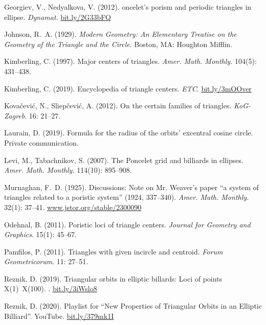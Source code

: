 \begin{thebibliography}{10}
Georgiev, V., Nedyalkova, V. (2012).
oncelet’s porism and periodic triangles in ellipse.
\newblock \emph{Dynamat}.
\newblock \url{bit.ly/2G33bFQ}

Johnson, R.~A. (1929).
\newblock \emph{Modern Geometry: An Elementary Treatise on the Geometry of the
  Triangle and the Circle}.
\newblock Boston, MA: Houghton Mifflin.

Kimberling, C. (1997).
\newblock Major centers of triangles.
\newblock \emph{Amer. Math. Monthly.} 104(5): 431--438.

Kimberling, C. (2019).
\newblock Encyclopedia of triangle centers.
\newblock \emph{ETC}.
\newblock \url{bit.ly/3mOOver}

Kova\v{c}evi\'c, N., Sliep\v{c}evi\'c, A. (2012).
\newblock On the certain families of triangles.
\newblock \emph{KoG-Zagreb}. 16: 21--27.

Laurain, D. (2019).
\newblock Formula for the radius of the orbits' excentral cosine circle.
\newblock Private communication.

Levi, M., Tabachnikov, S. (2007).
\newblock The {P}oncelet grid and billiards in ellipses.
\newblock \emph{Amer. Math. Monthly.} 114(10): 895--908.

Murnaghan, F.~D. (1925).
\newblock Discussions: Note on {Mr. Weaver}'s paper ``a system of triangles
  related to a poristic system'' (1924, 337--340).
\newblock \emph{Amer. Math. Monthly.} 32(1): 37--41.
\newblock \url{www.jstor.org/stable/2300090}

Odehnal, B. (2011).
\newblock Poristic loci of triangle centers.
\newblock \emph{Journal for Geometry and Graphics}. 15(1): 45--67.

Pamfilos, P. (2011).
\newblock Triangles with given incircle and centroid.
\newblock \emph{Forum Geometricorum}. 11: 27--51.

Reznik, D. (2019).
\newblock Triangular orbits in elliptic billards: Loci of points {X(1)~X(100)}.
.
\newblock \url{bit.ly/3iWslo8}

Reznik, D. (2020).
\newblock Playlist for {``New Properties of Triangular Orbits in an Elliptic
  Billiard''}.
\newblock YouTube.
\newblock \url{bit.ly/379mk1I}


\end{thebibliography}
